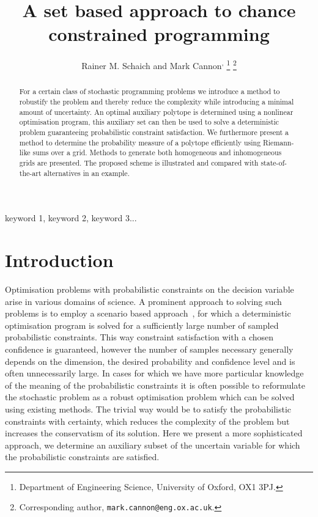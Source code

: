 \documentclass[letterpaper, 10pt, conference]{ieeeconf} %
\begin{document}
\title{A set based approach to chance constrained programming}

\author{Rainer M. Schaich\textsuperscript{\dag} %
         and Mark Cannon\textsuperscript{\dag,\ddag}%
\thanks{\textsuperscript{\dag} Department of Engineering Science, University of Oxford, OX1 3PJ.}%
\thanks{\textsuperscript{\ddag} Corresponding author, 
        \texttt{mark.cannon@eng.ox.ac.uk}.}
}
\newcommand{\note}[1]{\todo[inline]{#1}}

\maketitle

\begin{abstract} 
For a certain class of stochastic programming problems we introduce a method to robustify the problem and thereby reduce the complexity while introducing a minimal amount of uncertainty.
%
An optimal auxiliary polytope is determined using a nonlinear optimisation program, this auxiliary set can then be used to solve a deterministic problem guaranteeing probabilistic constraint satisfaction.
%
We furthermore present a method to determine the probability measure of a polytope efficiently using Riemann-like sums over a grid.
%
Methods to generate both homogeneous and inhomogeneous grids are presented.
%
The proposed scheme is illustrated and compared with state-of-the-art alternatives in an example.
\end{abstract}

\begin{keywords}
keyword 1, keyword 2, keyword 3...
\end{keywords}

\section{Introduction}\label{sec:intro}%
%
%
%
%
%
\noindent Optimisation problems with probabilistic constraints on the decision variable arise in various domains of science.
%
A prominent approach to solving such problems is to employ a scenario based approach~\cite{Calafiore:2010}, for which a deterministic optimisation program is solved for a sufficiently large number of sampled probabilistic constraints.
%
This way constraint satisfaction with a chosen confidence is guaranteed, however the number of samples necessary generally depends on the dimension, the desired probability and confidence level and is often unnecessarily large.
%
In cases for which we have more particular knowledge of the meaning of the probabilistic constraints it is often possible to reformulate the stochastic problem as a robust optimisation problem which can be solved using existing methods.
%
The trivial way would be to satisfy the probabilistic constraints with certainty, which reduces the complexity of the problem but increases the conservatism of its solution.
%
Here we present a more sophisticated approach, we determine an auxiliary subset of the uncertain variable for which the probabilistic constraints are satisfied.
%
\end{document}
